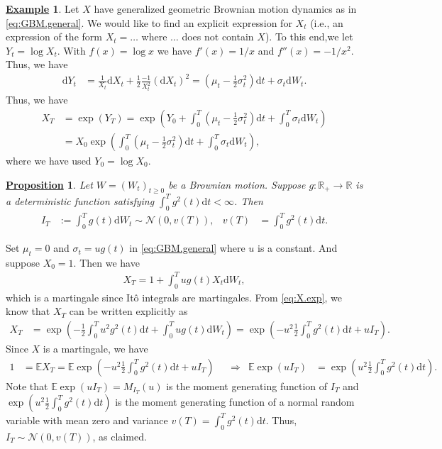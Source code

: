 \documentclass[12pt]{book}
\numberwithin{equation}{chapter}
\theoremstyle{plain}
\numberwithin{theorem}{section}
\newtheorem{proposition}[theorem]{\underline{Proposition}}
\theoremstyle{definition}
\newtheorem{example}[theorem]{\underline{Example}}
\numberwithin{exercise}{chapter}
\let\oldendproof\endproof
\renewenvironment{proof}[1][\proofname]{%
  \oldproof[\scshape\underline{#1}]%
}{\oldendproof}
\newcommand{\<}{\langle}
\renewcommand{\>}{\rangle}
\renewcommand{\(}{\left(}
\renewcommand{\)}{\right)}
\renewcommand{\[}{\left[}
\renewcommand{\]}{\right]}
\newcommand\Eb{\mathds{E}}
\newcommand\Rb{\mathds{R}}
\newcommand\Nc{\mathscr{N}}
\newcommand\sig{\sigma}
\newcommand\dd{\mathrm{d}}
\begin{document}
\begin{example}
Let $X$ have generalized geometric Brownian motion dynamics as in \eqref{eq:GBM.general}.  
We would like to find an explicit expression for $X_t$ (i.e., an expression of the form $X_t = \ldots$ where $\ldots$ does not contain $X$).  To this end,we let $Y_t = \log X_t$.  With $f(x) = \log x$ we have $f'(x) = 1/x$ and $f''(x) = - 1/x^2$.  Thus, we have
\begin{align}
\dd Y_t
	&=	\frac{1}{X_t} \dd X_t + \frac{1}{2} \frac{-1}{X_t^2} (\dd X_t)^2 
	 =	\( \mu_t - \tfrac{1}{2} \sig_t^2 \) \dd t + \sig_t \dd W_t .
\end{align}
Thus, we have
\begin{align}
X_T
	&=	\exp( Y_T ) = \exp \( Y_0 + \int_0^T \( \mu_t - \tfrac{1}{2} \sig_t^2 \) \dd t + \int_0^T \sig_t \dd W_t \) \\
	&=	X_0 \exp \( \int_0^T \( \mu_t - \tfrac{1}{2} \sig_t^2 \) \dd t + \int_0^T \sig_t \dd W_t \) , \label{eq:X.exp}
\end{align}
where we have used $Y_0 = \log X_0$.
\end{example}

\begin{proposition}
\label{prop:normal.ito}
Let $W = (W_t)_{t \geq 0}$ be a Brownian motion.
Suppose $g: \Rb_+ \to \Rb$ is a deterministic function satisfying $\int_0^T g^2(t) \dd t < \infty$.  Then
\begin{align}
I_T
	&:= \int_0^T g(t) \dd W_t \sim \Nc( 0, v(T)) , &
v(T)
	&=	\int_0^T g^2(t) \dd t .
\end{align}
\end{proposition}

\begin{proof}
Set $\mu_t = 0$ and $\sig_t = u g(t)$ in \eqref{eq:GBM.general} where $u$ is a constant.  And suppose $X_0 = 1$.  Then we have
\begin{align}
X_T
	= 1 + \int_0^T u g(t) X_t \dd W_t ,
\end{align}
which is a martingale since It\^o integrals are martingales.  From \eqref{eq:X.exp}, we know that $X_T$ can be written explicitly as
\begin{align}
X_T
	&=	\exp \( - \tfrac{1}{2} \int_0^T u^2 g^2(t) \dd t + \int_0^T u g(t) \dd W_t \) 
	=		\exp \( - u^2 \tfrac{1}{2} \int_0^T g^2(t) \dd t + u I_T \) .
\end{align}
Since $X$ is a martingale, we have
\begin{align}
1
	&= \Eb X_T 
	=		\Eb \exp \( - u^2 \tfrac{1}{2} \int_0^T g^2(t) \dd t + u I_T \) &
	&\Rightarrow&
\Eb \exp \( u I_T \)
	&=	\exp \( u^2 \tfrac{1}{2} \int_0^T g^2(t) \dd t \) .
\end{align}
Note that $\Eb \exp \( u I_T \) = M_{I_T}(u)$ is the moment generating function of $I_T$ and $\exp \( u^2 \tfrac{1}{2} \int_0^T g^2(t) \dd t \)$ is the moment generating function of a normal random variable with mean zero and variance $v(T) = \int_0^T g^2(t) \dd t$.  Thus, $I_T \sim \Nc(0,v(T))$, as claimed.
\end{proof}
\end{document}
